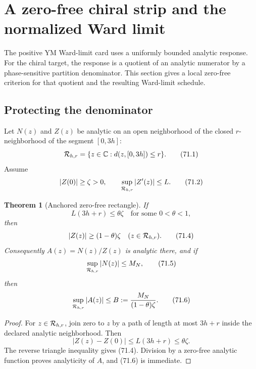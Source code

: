 \documentclass[11pt]{article}
\newtheorem{theorem}{Theorem}[section]
\begin{document}

\section{A zero-free chiral strip and the normalized Ward limit}
\label{sec:v11v71}

The positive YM Ward-limit card uses a uniformly bounded analytic
response.  For the chiral target, the response is a quotient of an
analytic numerator by a phase-sensitive partition denominator.  This
section gives a local zero-free criterion for that quotient and the
resulting Ward-limit schedule.

\subsection{Protecting the denominator}

Let \(N(z)\) and \(Z(z)\) be analytic on an open neighborhood of the
closed \(r\)-neighborhood of the segment \([0,3h]\):
\[
                         {\cal R}_{h,r}
          =\{z\in\mathbb C:d(z,[0,3h])\le r\}.                \tag{71.1}
\]
Assume
\[
                 |Z(0)|\ge\zeta>0,\qquad
                 \sup_{{\cal R}_{h,r}}|Z'(z)|\le L.          \tag{71.2}
\]

\begin{theorem}[Anchored zero-free rectangle]
\label{thm:v11v71-zero-free}
If
\[
                              L(3h+r)\le\theta\zeta
                              \quad\text{for some }0<\theta<1,\tag{71.3}
\]
then
\[
                         |Z(z)|\ge(1-\theta)\zeta
                              \quad(z\in{\cal R}_{h,r}).       \tag{71.4}
\]
Consequently \(A(z)=N(z)/Z(z)\) is analytic there, and if
\[
                         \sup_{{\cal R}_{h,r}}|N(z)|\le M_N,  \tag{71.5}
\]
then
\[
                         \sup_{{\cal R}_{h,r}}|A(z)|
                         \le B:=\frac{M_N}{(1-\theta)\zeta}.  \tag{71.6}
\]
\end{theorem}

\begin{proof}
For \(z\in{\cal R}_{h,r}\), join zero to \(z\) by a path of length at
most \(3h+r\) inside the declared analytic neighborhood.  Then
\[
 |Z(z)-Z(0)|\le L(3h+r)\le\theta\zeta.
\]
The reverse triangle inequality gives (71.4).  Division by a zero-free
analytic function proves analyticity of \(A\), and (71.6) is immediate.
\end{proof}
\end{document}
